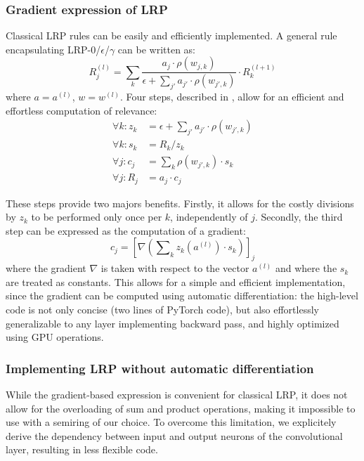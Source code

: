 \documentclass{../cs-classes/cs-classes}
\newcommand*{\1}{\digitsbb{1}}
\newcommand*{\0}{\digitsbb{0}}
\begin{document}
\subsubsection{Gradient expression of LRP}
Classical LRP rules can be easily and efficiently implemented. A general rule encapsulating LRP-0/$\epsilon$/$\gamma$ can be written as:
\begin{equation}
    R_j^{(l)} = \sum_k\frac{a_j\cdot\rho(w_{j,k})}{\epsilon+\sum_{j'}a_{j'}\cdot{\rho(w_{j',k})}} \cdot R_k^{(l+1)}
\end{equation}
where $a=a^{(l)}$, $w=w^{(l)}$. Four steps, described in \cite{montavon-lrp}, allow for an efficient and effortless computation of relevance:
\begin{equation}
    \begin{aligned}
        \textstyle\forall k: z_k &= \epsilon + \sum\nolimits_{j'}a_{j'}\cdot\rho(w_{j',k})\\
        \forall k: s_k &= R_k / z_k\\
        \forall j: c_j &= \sum\nolimits_k\rho(w_{j',k})\cdot s_k\\
        \forall j: \!R_j &= a_j\cdot c_j
    \end{aligned}
\end{equation}

These steps provide two majors benefits. Firstly, it allows for the costly divisions by $z_k$ to be performed only once per $k$, independently of $j$. Secondly, the third step can be expressed as the computation of a gradient:
\begin{equation}
    c_j = \left[\nabla\left(\sum\nolimits_k z_k(a^{(l)})\cdot s_k\right)\right]_j
\end{equation}
where the gradient $\nabla$ is taken with respect to the vector $a^{(l)}$ and where the $s_k$ are treated as constants. This allows for a simple and efficient implementation, since the gradient can be computed using automatic differentiation: the high-level code is not only concise (two lines of PyTorch code), but also effortlessly generalizable  to any layer implementing backward pass, and highly optimized using GPU operations.

\subsubsection{Implementing LRP without automatic differentiation}
While the gradient-based expression is convenient for classical LRP, it does not allow for the overloading of sum and product operations, making it impossible to use with a semiring of our choice. To overcome this limitation, we explicitely derive the dependency between input and output neurons of the convolutional layer, resulting in less flexible code. 
\end{document}
